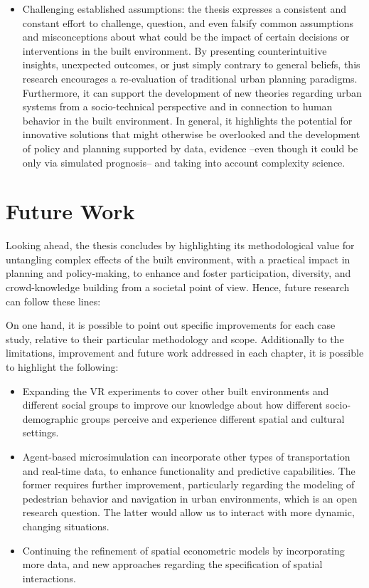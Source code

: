 \begin{itemize}
    \item Challenging established assumptions: the thesis expresses a consistent and constant effort to challenge, question, and even falsify common assumptions and misconceptions about what could be the impact of certain decisions or interventions in the built environment. By presenting counterintuitive insights, unexpected outcomes, or just simply contrary to general beliefs, this research encourages a re-evaluation of traditional urban planning paradigms. Furthermore, it can support the development of new theories regarding urban systems from a socio-technical perspective and in connection to human behavior in the built environment. In general, it highlights the potential for innovative solutions that might otherwise be overlooked and the development of policy and planning supported by data, evidence --even though it could be only via simulated prognosis-- and taking into account complexity science.
\end{itemize}

\section{Future Work}

Looking ahead, the thesis concludes by highlighting its methodological value for untangling complex effects of the built environment, with a practical impact in planning and policy-making, to enhance and foster participation, diversity, and crowd-knowledge building from a societal point of view. Hence, future research can follow these lines:

On one hand, it is possible to point out specific improvements for each case study, relative to their particular methodology and scope. Additionally to the limitations, improvement and future work addressed in each chapter, it is possible to highlight the following:
\begin{itemize}
    \item Expanding the VR experiments to cover other built environments and different social groups to improve our knowledge about how different socio-demographic groups perceive and experience different spatial and cultural settings. %
    \item Agent-based microsimulation can incorporate other types of transportation and real-time data, to enhance functionality and predictive capabilities. The former requires further improvement, particularly regarding the modeling of pedestrian behavior and navigation in urban environments, which is an open research question. The latter would allow us to interact with more dynamic, changing situations. 
    \item Continuing the refinement of spatial econometric models by incorporating more data, and new approaches regarding the specification of spatial interactions.
    
\end{itemize}

